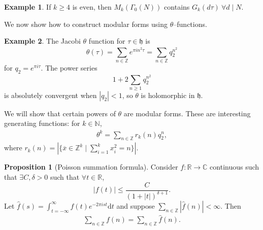 \documentclass{article}
\theoremstyle{definition}
\newtheorem{prop}[theorem]{Proposition}
\newtheorem{example}{Example}[section]
\begin{document}
\begin{example}
    If $k\ge 4$ is even, then $M_k(\Gamma_0(N))$ contains $G_k(d \tau) ~\forall d \mid N$.
\end{example}
We now show how to construct modular forms using $\theta$--functions.
\begin{example}
    The Jacobi $\theta$ function for $\tau \in \mathfrak{h}$ is \[
    \theta(\tau) = \sum_{n \in \mathbb{Z}}^{} e^{\pi i n^2 \tau} = \sum_{n \in \mathbb{Z}}^{} q_2^{n^2}
    \]
    for $q_2 = e^{\pi i \tau}$. The power series \[
    1 + 2\sum_{n\ge 1}^{} q_2^{n^2}
    \]
    is absolutely convergent when $|q_2|<1$, so $\theta$ is holomorphic in $\mathfrak{h}$.
\end{example}
We will show that certain powers of $\theta$ are modular forms. These are interesting generating functions: for $k \in \mathbb{N}$,
\begin{align*}
    \theta^k = \sum_{n \in \mathbb{Z}}^{} r_k(n)q_2^n,
\end{align*}
where $r_k(n) = |\{\overline{x} \in \mathbb{Z}^k \mid \sum_{i=1}^{k} x_i^2=n\}|$.
\begin{prop}[Poisson summation formula]
    Consider $f : \mathbb{R} \to \mathbb{C}$ continuous such that $\exists C,\delta>0$ such that $\forall t \in \mathbb{R}$, $$|f(t)| \le \frac{C}{(1+|t|)^{\delta+1}}.$$ Let $\hat{f}(s) = \int_{t=-\infty}^{\infty} f(t)e^{-2\pi i s t}\mathrm{d}t$ and suppose $\sum_{n \in \mathbb{Z}}^{} |\hat{f}(n)| < \infty$. Then \begin{align*}
        \sum_{n \in \mathbb{Z}}^{} f(n) = \sum_{n \in \mathbb{Z}}^{} \hat{f}(n).
    \end{align*}
\end{prop}
\end{document}
